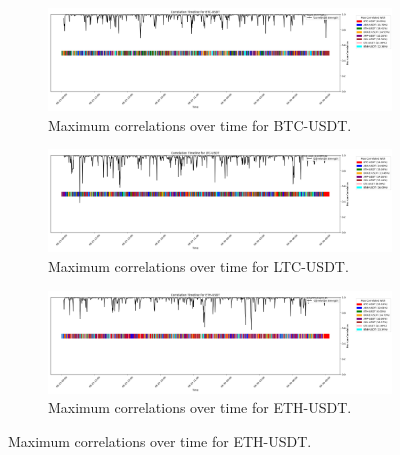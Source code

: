 \documentclass[11pt]{article}
\begin{document}
\begin{figure}[p]
    \captionsetup[subfigure]{labelformat=empty}

    \centering
    \begin{subfigure}{\linewidth}
        \centering
        \includegraphics[width=\linewidth]{../assets/correlations/BTC-USDT.png}
        \caption{Maximum correlations over time for BTC-USDT.}
        \label{fig:btc-corr}
    \end{subfigure}

    \vspace{0.1cm}

    \begin{subfigure}{\linewidth}
        \centering
        \includegraphics[width=\linewidth]{../assets/correlations/LTC-USDT.png}
        \caption{Maximum correlations over time for LTC-USDT.}
        \label{fig:ltc-corr}
    \end{subfigure}

    \vspace{0.1cm}

    \begin{subfigure}{\linewidth}
        \centering
        \includegraphics[width=\linewidth]{../assets/correlations/ETH-USDT.png}
        \caption{Maximum correlations over time for ETH-USDT.}
        \label{fig:eth-corr}
    \end{subfigure}


\end{figure}
\end{document}
